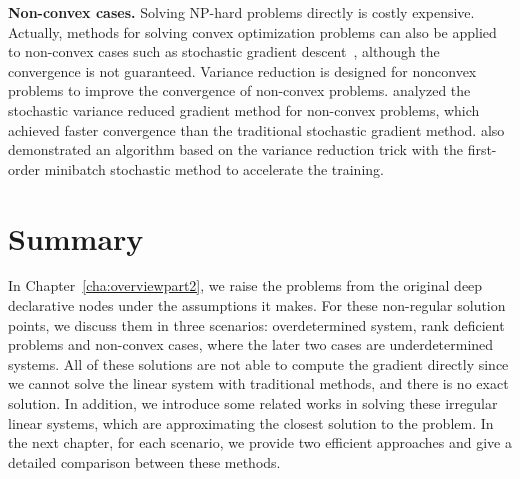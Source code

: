 \par \textbf{Non-convex cases.} Solving NP-hard problems directly is costly expensive. Actually, methods for solving convex optimization problems can also be applied to non-convex cases such as stochastic gradient descent~\citep{RH:51}, although the convergence is not guaranteed. Variance reduction is designed for nonconvex problems to improve the convergence of non-convex problems. \cite{RS:16} analyzed the stochastic variance reduced gradient method for non-convex problems, which achieved faster convergence than the traditional stochastic gradient method. \cite{AZ:16} also demonstrated an algorithm based on the variance reduction trick with the first-order minibatch stochastic
method to accelerate the training. 

\section{Summary}
In Chapter~\ref{cha:overviewpart2}, we raise the problems from the original deep declarative nodes under the assumptions it makes. For these non-regular solution points, we discuss them in three scenarios: overdetermined system, rank deficient problems and non-convex cases, where the later two cases are underdetermined systems. All of these solutions are not able to compute the gradient directly since we cannot solve the linear system with traditional methods, and there is no exact solution. In addition, we introduce some related works in solving these irregular linear systems, which are approximating the closest solution to the problem. In the next chapter, for each scenario, we provide two efficient approaches and give a detailed comparison between these methods. 
